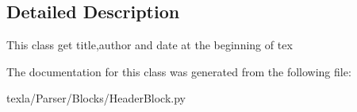 \subsection{Detailed Description}
\begin{DoxyVerb}This class get title,author and date at the beginning of tex\end{DoxyVerb}
 

The documentation for this class was generated from the following file\+:\begin{DoxyCompactItemize}
\item 
texla/\+Parser/\+Blocks/Header\+Block.\+py\end{DoxyCompactItemize}
